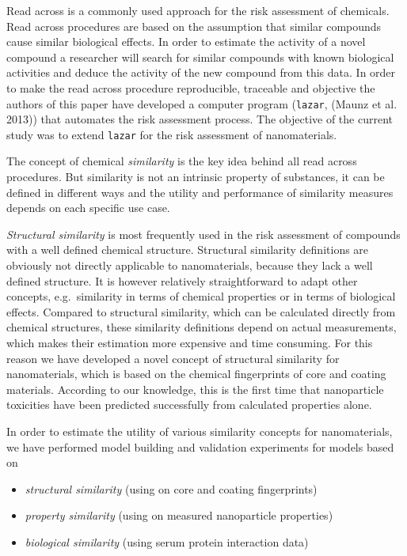 \documentclass[utf8]{frontiersHLTH} %
\providecommand{\tightlist}{%
  \setlength{\itemsep}{0pt}\setlength{\parskip}{0pt}}
\begin{document}
Read across is a commonly used approach for the risk assessment of
chemicals. Read across procedures are based on the assumption that
similar compounds cause similar biological effects. In order to estimate
the activity of a novel compound a researcher will search for similar
compounds with known biological activities and deduce the activity of
the new compound from this data. In order to make the read across
procedure reproducible, traceable and objective the authors of this
paper have developed a computer program (\texttt{lazar}, (Maunz et al.
2013)) that automates the risk assessment process. The objective of the
current study was to extend \texttt{lazar} for the risk assessment of
nanomaterials.

The concept of chemical \emph{similarity} is the key idea behind all
read across procedures. But similarity is not an intrinsic property of
substances, it can be defined in different ways and the utility and
performance of similarity measures depends on each specific use case.

\emph{Structural similarity} is most frequently used in the risk
assessment of compounds with a well defined chemical structure.
Structural similarity definitions are obviously not directly applicable
to nanomaterials, because they lack a well defined structure. It is
however relatively straightforward to adapt other concepts,
e.g.~similarity in terms of chemical properties or in terms of
biological effects. Compared to structural similarity, which can be
calculated directly from chemical structures, these similarity
definitions depend on actual measurements, which makes their estimation
more expensive and time consuming. For this reason we have developed a
novel concept of structural similarity for nanomaterials, which is based
on the chemical fingerprints of core and coating materials. According to
our knowledge, this is the first time that nanoparticle toxicities have
been predicted successfully from calculated properties alone.

In order to estimate the utility of various similarity concepts for
nanomaterials, we have performed model building and validation
experiments for models based on

\begin{itemize}
\tightlist
\item
  \emph{structural similarity} (using on core and coating fingerprints)
\item
  \emph{property similarity} (using on measured nanoparticle properties)
\item
  \emph{biological similarity} (using serum protein interaction data)
\end{itemize}
\end{document}
